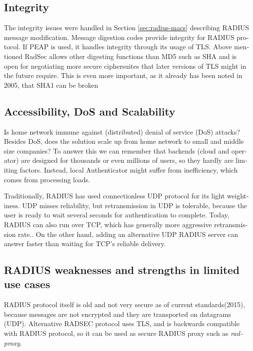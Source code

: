 \documentclass[12pt,a4paper,english]{tutthesis}
\begin{document}
\begin{otherlanguage}{english}
\subsection{Integrity}
\label{sec-6-4-2}
The integrity issues were handled in Section \ref{sec:radius-macs} describing
RADIUS message modification.
Message digestion codes provide integrity for RADIUS protocol.
If PEAP is used, it handles integrity through its usage of
 TLS\cite{peap}.
Above mentioned RadSec allows other digesting functions than MD5 such
as SHA and is open for negotiating more secure ciphersuites that later
versions of TLS might in the future require\cite{rfc6614}. This is
even more important, as it already has been noted in 2005, that SHA1 can be
broken

\subsection{Accessibility, DoS and Scalability}
\label{sec-6-4-3}

Is home network immune against (distributed) denial of service (DoS)
attacks? Besides DoS, does the solution scale up from home network to
small and middle size companies?
To answer this we can remember that backends (cloud and operator) are
designed for thousands or even millions of users, so 
they hardly are limiting factors. Instead, local
Authenticator might suffer from inefficiency, which
comes from processing loads\cite{2009-lin-simefficiency}.


Traditionally, RADIUS has used connection\-less UDP protocol for its
light weightiness. UDP misses reliability, but retransmission in UDP is
tolerable, because the user is ready to wait  several seconds for
authentication to complete. Today, RADIUS can also run over TCP, which
has generally more aggressive retransmission
rate.\cite[Section 2.2.1]{rfc5080}. 
On the other hand, adding an
alternative UDP RADIUS server can answer faster than waiting for TCP's reliable delivery.


\subsection{RADIUS weaknesses and strengths in limited use cases}
\label{sec-6-4-4}


RADIUS protocol itself is old and not very secure as of current
standards(2015), because messages are not encrypted and they are
transported on datagrams (UDP). Alternative RADSEC protocol uses TLS, and 
is backwards compatible with RADIUS protocol, so it can be used
as secure RADIUS proxy such as \emph{radproxy}\cite{uninett-radproxy}.


\end{otherlanguage}
\end{document}
